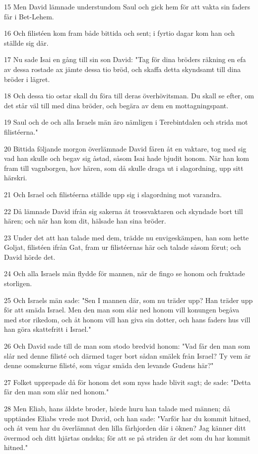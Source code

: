 \par 15 Men David lämnade understundom Saul och gick hem för att vakta sin faders får i Bet-Lehem.
\par 16 Och filistéen kom fram både bittida och sent; i fyrtio dagar kom han och ställde sig där.
\par 17 Nu sade Isai en gång till sin son David: "Tag för dina bröders räkning en efa av dessa rostade ax jämte dessa tio bröd, och skaffa detta skyndsamt till dina bröder i lägret.
\par 18 Och dessa tio ostar skall du föra till deras överhövitsman. Du skall se efter, om det står väl till med dina bröder, och begära av dem en mottagningspant.
\par 19 Saul och de och alla Israels män äro nämligen i Terebintdalen och strida mot filistéerna."
\par 20 Bittida följande morgon överlämnade David fåren åt en vaktare, tog med sig vad han skulle och begav sig åstad, såsom Isai hade bjudit honom. När han kom fram till vagnborgen, hov hären, som då skulle draga ut i slagordning, upp sitt härskri.
\par 21 Och Israel och filistéerna ställde upp sig i slagordning mot varandra.
\par 22 Då lämnade David ifrån sig sakerna åt trossvaktaren och skyndade bort till hären; och när han kom dit, hälsade han sina bröder.
\par 23 Under det att han talade med dem, trädde nu envigeskämpen, han som hette Goljat, filistéen ifrån Gat, fram ur filistéernas här och talade såsom förut; och David hörde det.
\par 24 Och alla Israels män flydde för mannen, när de fingo se honom och fruktade storligen.
\par 25 Och Israels män sade: "Sen I mannen där, som nu träder upp? Han träder upp för att smäda Israel. Men den man som slår ned honom vill konungen begåva med stor rikedom, och åt honom vill han giva sin dotter, och hans faders hus vill han göra skattefritt i Israel."
\par 26 Och David sade till de man som stodo bredvid honom: "Vad får den man som slår ned denne filisté och därmed tager bort sådan smälek från Israel? Ty vem är denne oomskurne filisté, som vågar smäda den levande Gudens här?"
\par 27 Folket upprepade då för honom det som nyss hade blivit sagt; de sade: "Detta får den man som slår ned honom."
\par 28 Men Eliab, hans äldste broder, hörde huru han talade med männen; då upptändes Eliabs vrede mot David, och han sade: "Varför har du kommit hitned, och åt vem har du överlämnat den lilla fårhjorden där i öknen? Jag känner ditt övermod och ditt hjärtas ondska; för att se på striden är det som du har kommit hitned."
